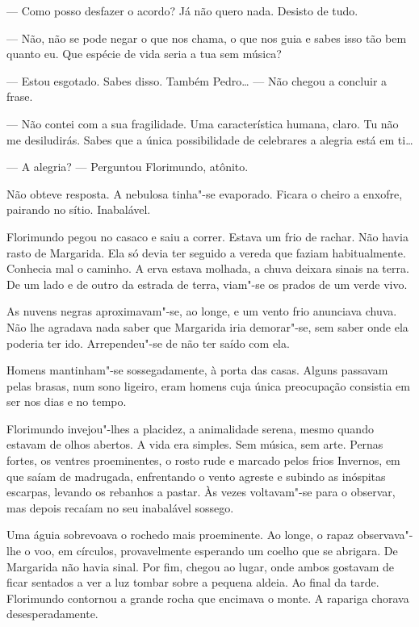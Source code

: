 --- Como posso desfazer o acordo? Já não quero nada. Desisto de tudo.

--- Não, não se pode negar o que nos chama, o que nos guia e sabes isso
tão bem quanto eu. Que espécie de vida seria a tua sem música?

--- Estou esgotado. Sabes disso. Também Pedro\ldots{} --- Não chegou a concluir a
frase.

--- Não contei com a sua fragilidade. Uma característica humana, claro. Tu
não me desiludirás. Sabes que a única possibilidade de celebrares a
alegria está em ti\ldots{}

--- A alegria? --- Perguntou Florimundo, atônito.

Não obteve resposta. A nebulosa tinha"-se evaporado. Ficara o cheiro a
enxofre, pairando no sítio. Inabalável.

Florimundo pegou no casaco e saiu a correr. Estava um frio de rachar.
Não havia rasto de Margarida. Ela só devia ter seguido a vereda que
faziam habitualmente. Conhecia mal o caminho. A erva estava molhada, a
chuva deixara sinais na terra. De um lado e de outro da estrada de
terra, viam"-se os prados de um verde vivo.

As nuvens negras aproximavam"-se, ao longe, e um vento frio anunciava
chuva. Não lhe agradava nada saber que Margarida iria demorar"-se, sem
saber onde ela poderia ter ido. Arrependeu"-se de não ter saído com ela.

Homens mantinham"-se sossegadamente, à porta das casas. Alguns passavam
pelas brasas, num sono ligeiro, eram homens cuja única preocupação
consistia em ser nos dias e no tempo.

Florimundo invejou"-lhes a placidez, a animalidade serena, mesmo quando
estavam de olhos abertos. A vida era simples. Sem música, sem arte.
Pernas fortes, os ventres proeminentes, o rosto rude e marcado pelos
frios Invernos, em que saíam de madrugada, enfrentando o vento agreste e
subindo as inóspitas escarpas, levando os rebanhos a pastar. Às vezes
voltavam"-se para o observar, mas depois recaíam no seu inabalável
sossego.

Uma águia sobrevoava o rochedo mais proeminente. Ao longe, o rapaz
observava"-lhe o voo, em círculos, provavelmente esperando um coelho que
se abrigara. De Margarida não havia sinal. Por fim, chegou ao lugar,
onde ambos gostavam de ficar sentados a ver a luz tombar sobre a pequena
aldeia. Ao final da tarde. Florimundo contornou a grande rocha que
encimava o monte. A rapariga chorava desesperadamente.

